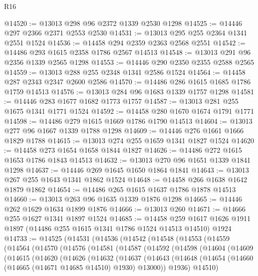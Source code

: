 \begin{lexlean}{R16}
\begin{coremodule}
@14520 := @13013 @298 @96 @2372 @1339 @2530 @1298
@14525 := @14446 @297 @2366 @2371 @2553 @2530
@14531 := @13013 @295 @255 @2364 @1341 @2551 @1524
@14536 := @14458 @294 @2359 @2363 @2568 @2551
@14542 := @14486 @293 @1615 @2358 @1786 @2567 @14513
@14548 := @13013 @291 @96 @2356 @1339 @2565 @1298
@14553 := @14446 @290 @2350 @2355 @2588 @2565
@14559 := @13013 @288 @255 @2348 @1341 @2586 @1524
@14564 := @14458 @287 @2343 @2347 @2600 @2586
@14570 := @14486 @286 @1615 @1685 @1786 @1759 @14513
@14576 := @13013 @284 @96 @1683 @1339 @1757 @1298
@14581 := @14446 @283 @1677 @1682 @1773 @1757
@14587 := @13013 @281 @255 @1675 @1341 @1771 @1524
@14592 := @14458 @280 @1670 @1674 @1791 @1771
@14598 := @14486 @279 @1615 @1669 @1786 @1790 @14513
@14604 := @13013 @277 @96 @1667 @1339 @1788 @1298
@14609 := @14446 @276 @1661 @1666 @1829 @1788
@14615 := @13013 @274 @255 @1659 @1341 @1827 @1524
@14620 := @14458 @273 @1654 @1658 @1844 @1827
@14626 := @14486 @272 @1615 @1653 @1786 @1843 @14513
@14632 := @13013 @270 @96 @1651 @1339 @1841 @1298
@14637 := @14446 @269 @1645 @1650 @1864 @1841
@14643 := @13013 @267 @255 @1643 @1341 @1862 @1524
@14648 := @14458 @266 @1638 @1642 @1879 @1862
@14654 := @14486 @265 @1615 @1637 @1786 @1878 @14513
@14660 := @13013 @263 @96 @1635 @1339 @1876 @1298
@14665 := @14446 @262 @1629 @1634 @1899 @1876
@14666 := @13013 @260
@14671 := @14666 @255 @1627 @1341 @1897 @1524
@14685 := @14458
    @259
    @1617
    @1626
    @1911
    @1897
    (@14486 @255 @1615 @1341 @1786 @1524 @14513 @14510)
    @1924
@14733 := @14525
    (@14531
      (@14536
        (@14542
          (@14548
            (@14553
              (@14559
                (@14564
                  (@14570
                    (@14576
                      (@14581
                        (@14587
                          (@14592
                            (@14598
                              (@14604
                                (@14609
                                  (@14615
                                    (@14620
                                      (@14626
                                        (@14632
                                          (@14637
                                            (@14643
                                              (@14648
                                                (@14654
                                                  (@14660
                                                    (@14665 (@14671 @14685 @14510) @1930)
                                                    @13000))
                                                @1936)
                                              @14510)

\end{coremodule}
\end{lexlean}
